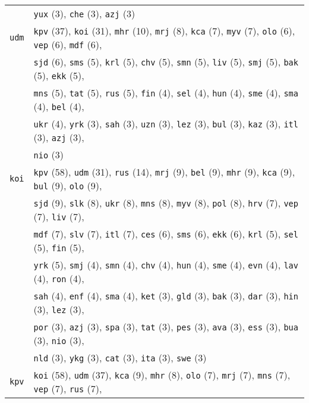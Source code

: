 \begin{center}
\begin{longtable}{ll}
 & \texttt{yux} (3), \texttt{che} (3), \texttt{azj} (3) \\
\texttt{udm} & \texttt{kpv} (37), \texttt{koi} (31), \texttt{mhr} (10), \texttt{mrj} (8), \texttt{kca} (7), \texttt{myv} (7), \texttt{olo} (6), \texttt{vep} (6), \texttt{mdf} (6), \\
 & \texttt{sjd} (6), \texttt{sms} (5), \texttt{krl} (5), \texttt{chv} (5), \texttt{smn} (5), \texttt{liv} (5), \texttt{smj} (5), \texttt{bak} (5), \texttt{ekk} (5), \\
 & \texttt{mns} (5), \texttt{tat} (5), \texttt{rus} (5), \texttt{fin} (4), \texttt{sel} (4), \texttt{hun} (4), \texttt{sme} (4), \texttt{sma} (4), \texttt{bel} (4), \\
 & \texttt{ukr} (4), \texttt{yrk} (3), \texttt{sah} (3), \texttt{uzn} (3), \texttt{lez} (3), \texttt{bul} (3), \texttt{kaz} (3), \texttt{itl} (3), \texttt{azj} (3), \\
 & \texttt{nio} (3) \\
\texttt{koi} & \texttt{kpv} (58), \texttt{udm} (31), \texttt{rus} (14), \texttt{mrj} (9), \texttt{bel} (9), \texttt{mhr} (9), \texttt{kca} (9), \texttt{bul} (9), \texttt{olo} (9), \\
 & \texttt{sjd} (9), \texttt{slk} (8), \texttt{ukr} (8), \texttt{mns} (8), \texttt{myv} (8), \texttt{pol} (8), \texttt{hrv} (7), \texttt{vep} (7), \texttt{liv} (7), \\
 & \texttt{mdf} (7), \texttt{slv} (7), \texttt{itl} (7), \texttt{ces} (6), \texttt{sms} (6), \texttt{ekk} (6), \texttt{krl} (5), \texttt{sel} (5), \texttt{fin} (5), \\
 & \texttt{yrk} (5), \texttt{smj} (4), \texttt{smn} (4), \texttt{chv} (4), \texttt{hun} (4), \texttt{sme} (4), \texttt{evn} (4), \texttt{lav} (4), \texttt{ron} (4), \\
 & \texttt{sah} (4), \texttt{enf} (4), \texttt{sma} (4), \texttt{ket} (3), \texttt{gld} (3), \texttt{bak} (3), \texttt{dar} (3), \texttt{hin} (3), \texttt{lez} (3), \\
 & \texttt{por} (3), \texttt{azj} (3), \texttt{spa} (3), \texttt{tat} (3), \texttt{pes} (3), \texttt{ava} (3), \texttt{ess} (3), \texttt{bua} (3), \texttt{nio} (3), \\
 & \texttt{nld} (3), \texttt{ykg} (3), \texttt{cat} (3), \texttt{ita} (3), \texttt{swe} (3) \\
\texttt{kpv} & \texttt{koi} (58), \texttt{udm} (37), \texttt{kca} (9), \texttt{mhr} (8), \texttt{olo} (7), \texttt{mrj} (7), \texttt{mns} (7), \texttt{vep} (7), \texttt{rus} (7), \\

\end{longtable}
\end{center}

